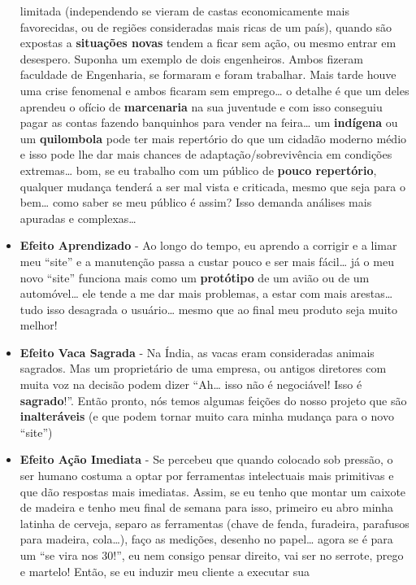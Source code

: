 \documentclass[11pt]{article}
\begin{document}
\begin{itemize}
  limitada (independendo se vieram de castas economicamente mais
  favorecidas, ou de regiões consideradas mais ricas de um país), quando
  são expostas a \textbf{situações novas} tendem a ficar sem ação, ou
  mesmo entrar em desespero. Suponha um exemplo de dois engenheiros.
  Ambos fizeram faculdade de Engenharia, se formaram e foram trabalhar.
  Mais tarde houve uma crise fenomenal e ambos ficaram sem
  emprego\ldots{} o detalhe é que um deles aprendeu o ofício de
  \textbf{marcenaria} na sua juventude e com isso conseguiu pagar as
  contas fazendo banquinhos para vender na feira\ldots{} um
  \textbf{indígena} ou um \textbf{quilombola} pode ter mais repertório
  do que um cidadão moderno médio e isso pode lhe dar mais chances de
  adaptação/sobrevivência em condições extremas\ldots{} bom, se eu
  trabalho com um público de \textbf{pouco repertório}, qualquer mudança
  tenderá a ser mal vista e criticada, mesmo que seja para o bem\ldots{}
  como saber se meu público é assim? Isso demanda análises mais apuradas
  e complexas\ldots{}
\item
  \textbf{Efeito Aprendizado} - Ao longo do tempo, eu aprendo a corrigir
  e a limar meu ``site'' e a manutenção passa a custar pouco e ser mais
  fácil\ldots{} já o meu novo ``site'' funciona mais como um
  \textbf{protótipo} de um avião ou de um automóvel\ldots{} ele tende a
  me dar mais problemas, a estar com mais arestas\ldots{} tudo isso
  desagrada o usuário\ldots{} mesmo que ao final meu produto seja muito
  melhor!
\item
  \textbf{Efeito Vaca Sagrada} - Na Índia, as vacas eram consideradas
  animais sagrados. Mas um proprietário de uma empresa, ou antigos
  diretores com muita voz na decisão podem dizer ``Ah\ldots{} isso não é
  negociável! Isso é \textbf{sagrado}!''. Então pronto, nós temos
  algumas feições do nosso projeto que são \textbf{inalteráveis} (e que
  podem tornar muito cara minha mudança para o novo ``site'')
\item
  \textbf{Efeito Ação Imediata} - Se percebeu que quando colocado sob
  pressão, o ser humano costuma a optar por ferramentas intelectuais
  mais primitivas e que dão respostas mais imediatas. Assim, se eu tenho
  que montar um caixote de madeira e tenho meu final de semana para
  isso, primeiro eu abro minha latinha de cerveja, separo as ferramentas
  (chave de fenda, furadeira, parafusos para madeira, cola\ldots{}),
  faço as medições, desenho no papel\ldots{} agora se é para um ``se
  vira nos 30!'', eu nem consigo pensar direito, vai ser no serrote,
  prego e martelo! Então, se eu induzir meu cliente a executar sua

\end{itemize}
\end{document}
